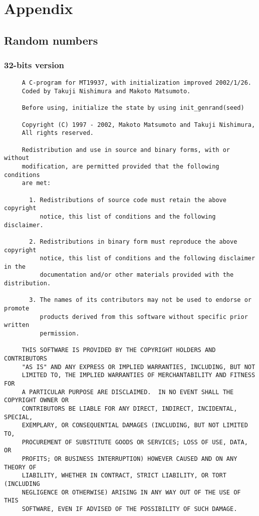 \chapter*{Appendix}

\section*{Random numbers}

\subsection*{32-bits version}
\begin{verbatim}
     A C-program for MT19937, with initialization improved 2002/1/26.
     Coded by Takuji Nishimura and Makoto Matsumoto.

     Before using, initialize the state by using init_genrand(seed)  

     Copyright (C) 1997 - 2002, Makoto Matsumoto and Takuji Nishimura,
     All rights reserved.                          

     Redistribution and use in source and binary forms, with or without
     modification, are permitted provided that the following conditions
     are met:

       1. Redistributions of source code must retain the above copyright
          notice, this list of conditions and the following disclaimer.

       2. Redistributions in binary form must reproduce the above copyright
          notice, this list of conditions and the following disclaimer in the
          documentation and/or other materials provided with the distribution.

       3. The names of its contributors may not be used to endorse or promote 
          products derived from this software without specific prior written 
          permission.

     THIS SOFTWARE IS PROVIDED BY THE COPYRIGHT HOLDERS AND CONTRIBUTORS
     "AS IS" AND ANY EXPRESS OR IMPLIED WARRANTIES, INCLUDING, BUT NOT
     LIMITED TO, THE IMPLIED WARRANTIES OF MERCHANTABILITY AND FITNESS FOR
     A PARTICULAR PURPOSE ARE DISCLAIMED.  IN NO EVENT SHALL THE COPYRIGHT OWNER OR
     CONTRIBUTORS BE LIABLE FOR ANY DIRECT, INDIRECT, INCIDENTAL, SPECIAL,
     EXEMPLARY, OR CONSEQUENTIAL DAMAGES (INCLUDING, BUT NOT LIMITED TO,
     PROCUREMENT OF SUBSTITUTE GOODS OR SERVICES; LOSS OF USE, DATA, OR
     PROFITS; OR BUSINESS INTERRUPTION) HOWEVER CAUSED AND ON ANY THEORY OF
     LIABILITY, WHETHER IN CONTRACT, STRICT LIABILITY, OR TORT (INCLUDING
     NEGLIGENCE OR OTHERWISE) ARISING IN ANY WAY OUT OF THE USE OF THIS
     SOFTWARE, EVEN IF ADVISED OF THE POSSIBILITY OF SUCH DAMAGE.
\end{verbatim}

